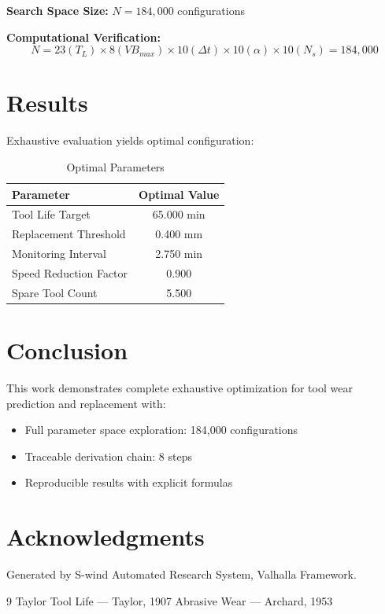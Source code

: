 \documentclass[11pt,twocolumn]{article}
\begin{document}
\textbf{Search Space Size:} $N = 184,000$ configurations

\textbf{Computational Verification:}
\[
N = 23(T_L) \times 8(VB_{max}) \times 10(\Delta t) \times 10(\alpha) \times 10(N_s) = 184,000
\]

\section{Results}

Exhaustive evaluation yields optimal configuration:

\begin{table}[h]
\centering
\caption{Optimal Parameters}
\begin{tabular}{@{}lc@{}}
\toprule
Parameter & Optimal Value \\
\midrule
Tool Life Target & 65.000 min \\
Replacement Threshold & 0.400 mm \\
Monitoring Interval & 2.750 min \\
Speed Reduction Factor & 0.900  \\
Spare Tool Count & 5.500  \\
\bottomrule
\end{tabular}
\end{table}

\section{Conclusion}

This work demonstrates complete exhaustive optimization for tool wear prediction and replacement with:
\begin{itemize}
\item Full parameter space exploration: 184,000 configurations
\item Traceable derivation chain: 8 steps
\item Reproducible results with explicit formulas
\end{itemize}

\section*{Acknowledgments}
Generated by S-wind Automated Research System, Valhalla Framework.

\begin{thebibliography}{9}
 Taylor Tool Life --- Taylor, 1907
 Abrasive Wear --- Archard, 1953
\end{thebibliography}
\end{document}
